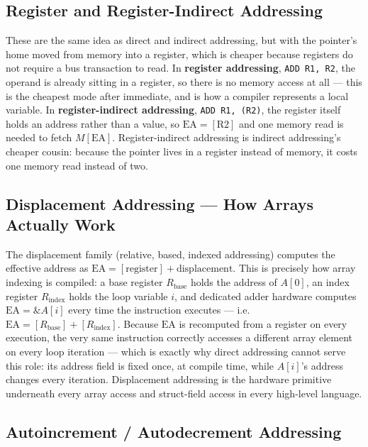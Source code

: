 \documentclass[11pt]{article}
\begin{document}
\subsection{Register and Register-Indirect Addressing}

These are the same idea as direct and indirect addressing, but with the pointer's home moved from memory into a register, which is cheaper because registers do not require a bus transaction to read. In \textbf{register addressing}, \texttt{ADD R1, R2}, the operand is already sitting in a register, so there is no memory access at all --- this is the cheapest mode after immediate, and is how a compiler represents a local variable. In \textbf{register-indirect addressing}, \texttt{ADD R1, (R2)}, the register itself holds an address rather than a value, so $\text{EA} = [\text{R2}]$ and one memory read is needed to fetch $M[\text{EA}]$. Register-indirect addressing is indirect addressing's cheaper cousin: because the pointer lives in a register instead of memory, it costs one memory read instead of two.

\subsection{Displacement Addressing --- How Arrays Actually Work}

The displacement family (relative, based, indexed addressing) computes the effective address as $\text{EA} = [\text{register}] + \text{displacement}$. This is precisely how array indexing is compiled: a base register $R_{\text{base}}$ holds the address of $A[0]$, an index register $R_{\text{index}}$ holds the loop variable $i$, and dedicated adder hardware computes $\text{EA} = \&A[i]$ every time the instruction executes --- i.e.\ $\text{EA} = [R_{\text{base}}] + [R_{\text{index}}]$. Because $\text{EA}$ is recomputed from a register on every execution, the very same instruction correctly accesses a different array element on every loop iteration --- which is exactly why direct addressing cannot serve this role: its address field is fixed once, at compile time, while $A[i]$'s address changes every iteration. Displacement addressing is the hardware primitive underneath every array access and struct-field access in every high-level language.

\subsection{Autoincrement / Autodecrement Addressing}
\end{document}
